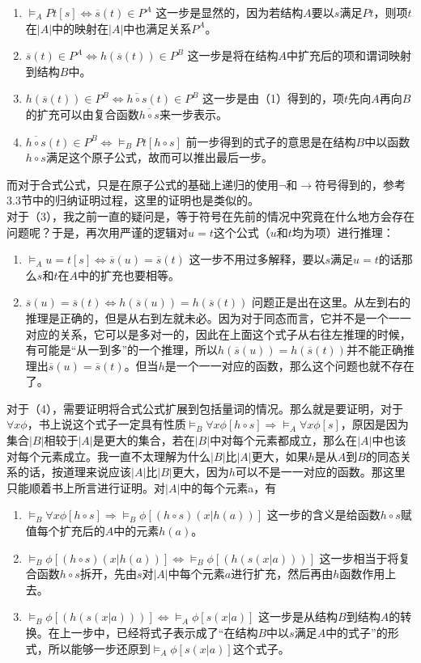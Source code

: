 \documentclass{article}
\begin{document}
\begin{enumerate}
    \item $\models_A Pt[s] \iff \overline{s}(t) \in P^A$ 这一步是显然的，因为若结构$A$要以$s$满足$Pt$，则项$t$在$|A|$中的映射在$|A|$中也满足关系$P^A$。
    \item $\overline{s}(t) \in P^A \iff h(\overline{s}(t)) \in P^B$ 这一步是将在结构$A$中扩充后的项和谓词映射到结构$B$中。
    \item $h(\overline{s}(t)) \in P^B \iff \overline{h \circ s}(t) \in P^B$ 这一步是由（1）得到的，项$t$先向$A$再向$B$的扩充可以由复合函数$\overline{h \circ s}$来一步表示。 
    \item $\overline{h \circ s}(t) \in P^B \iff \models_B Pt[h \circ s]$ 前一步得到的式子的意思是在结构$B$中以函数$h \circ s$满足这个原子公式，故而可以推出最后一步。
\end{enumerate}
而对于合式公式，只是在原子公式的基础上递归的使用$\neg$和$\rightarrow$符号得到的，参考3.3节中的归纳证明过程，这里的证明也是类似的。\\

对于（3），我之前一直的疑问是，等于符号在先前的情况中究竟在什么地方会存在问题呢？于是，再次用严谨的逻辑对$u = t$这个公式（$u$和$t$均为项）进行推理：
\begin{enumerate}
    \item $\models_A u=t[s] \iff \overline{s}(u) = \overline{s}(t)$ 这一步不用过多解释，要以$s$满足$u = t$的话那么$s$和$t$在$A$中的扩充也要相等。
    \item $\overline{s}(u) = \overline{s}(t) \iff h(\overline{s}(u)) = h(\overline{s}(t))$ 问题正是出在这里。从左到右的推理是正确的，但是从右到左就未必。因为对于同态而言，它并不是一个一一对应的关系，它可以是多对一的，因此在上面这个式子从右往左推理的时候，有可能是“从一到多”的一个推理，所以$h(\overline{s}(u)) = h(\overline{s}(t))$并不能正确推理出$\overline{s}(u) = \overline{s}(t)$。但当$h$是一个一一对应的函数，那么这个问题也就不存在了。
\end{enumerate}
对于（4），需要证明将合式公式扩展到包括量词的情况。那么就是要证明，对于$\forall x\phi$，书上说这个式子一定具有性质$\models_B \forall x\phi[h \circ s] \Rightarrow \models_A \forall x \phi[s]$，原因是因为集合$|B|$相较于$|A|$是更大的集合，若在$|B|$中对每个元素都成立，那么在$|A|$中也该对每个元素成立。我一直不太理解为什么$|B|$比$|A|$更大，如果$h$是从$A$到$B$的同态关系的话，按道理来说应该$|A|$比$|B|$更大，因为$h$可以不是一一对应的函数。那这里只能顺着书上所言进行证明。对$|A|$中的每个元素a，有
\begin{enumerate}
    \item $\models_B \forall x\phi[h \circ s] \Rightarrow \models_B \phi[(h \circ s)(x|h(a))]$ 这一步的含义是给函数$h \circ s$赋值每个扩充后的$A$中的元素$h(a)$。
    \item $\models_B \phi[(h \circ s)(x|h(a))] \iff \models_B \phi[(h(s(x|a)))]$ 这一步相当于将复合函数$h \circ s$拆开，先由$s$对$|A|$中每个元素$a$进行扩充，然后再由$h$函数作用上去。
    \item $\models_B \phi[(h(s(x|a)))] \iff \models_A \phi[s(x|a)]$ 这一步是从结构$B$到结构$A$的转换。在上一步中，已经将式子表示成了“在结构$B$中以$s$满足$A$中的式子”的形式，所以能够一步还原到$\models_A \phi[s(x|a)]$这个式子。
\end{enumerate}
\end{document}
